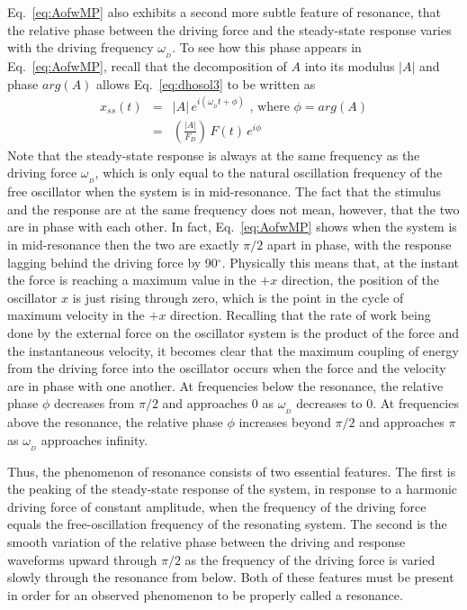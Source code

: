 \documentclass{revtex4}
\begin{document}
Eq.~\ref{eq:AofwMP} also exhibits a second more subtle feature of resonance,
that the relative phase between the driving force and the steady-state
response varies with the driving frequency $\omega_{_D}$.  To see how
this phase appears in Eq.~\ref{eq:AofwMP}, recall that the decomposition
of $A$ into its modulus $|A|$ and phase $arg(A)$ allows Eq.~\ref{eq:dhosol3}
to be written as
\begin{eqnarray}
x_{ss}(t)&=&|A|\,e^{i(\omega_{_D}t+\phi)}\mbox{~, where~}
\phi=arg(A) \nonumber \\
&=& \left(\frac{|A|}{F_D}\right)\,F(t)\,e^{i\phi}
\end{eqnarray}
Note that the steady-state response is always at the same frequency as
the driving force $\omega_{_D}$, which is only equal to the natural
oscillation frequency of the free oscillator when the system is in
mid-resonance.  The fact that the stimulus and the response are at the
same frequency does not mean, however, that the two are in phase with
each other.  In fact, Eq.~\ref{eq:AofwMP} shows when the system is
in mid-resonance then the two are exactly $\pi/2$ apart in phase, with
the response lagging behind the driving force by 90$^{\circ}$. Physically
this means that, at the instant the force is reaching a maximum value in
the $+x$ direction, the position of the oscillator $x$ is just rising through
zero, which is the point in the cycle of maximum velocity in the $+x$ 
direction.  Recalling that the rate of work being done by the external
force on the oscillator system is the product of the force and the
instantaneous velocity, it becomes clear that the maximum coupling of
energy from the driving force into the oscillator occurs when the force
and the velocity are in phase with one another.  At frequencies below
the resonance, the relative phase $\phi$ decreases from $\pi/2$ and
approaches 0 as $\omega_{_D}$ decreases to 0.  At frequencies above the
resonance, the relative phase $\phi$ increases beyond $\pi/2$ and approaches
$\pi$ as $\omega_{_D}$ approaches infinity.

Thus, the phenomenon of resonance consists of two essential features.
The first is the peaking of the steady-state response of the system, in
response to a harmonic driving force of constant amplitude, when the
frequency of the driving force equals the free-oscillation frequency of
the resonating system.   The second is the smooth variation of the relative
phase between the driving and response waveforms upward through $\pi/2$ as
the frequency of the driving force is varied slowly through the resonance
from below.  Both of these features must be present in order for an
observed phenomenon to be properly called a resonance.
\end{document}

